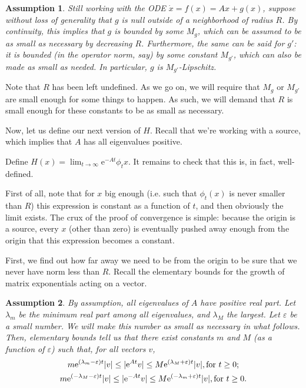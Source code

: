 \documentclass{article}
\newcommand{\e}{\mathrm{e}}
\DeclarePairedDelimiter{\abs}{\lvert}{\rvert}
\newtheorem*{Assumption}{Assumption}
\begin{document}
\begin{Assumption}
Still working with the ODE $\dot x = f(x) = A x + g(x)$, suppose without loss of generality that $g$ is null outside of a neighborhood of radius $R$. By continuity, this implies that $g$ is bounded by some $M_g$, which can be assumed to be as small as necessary by decreasing $R$. Furthermore, the same can be said for $g'$: it is bounded (in the operator norm, say) by some constant $M_{g'}$, which can also be made as small as needed. In particular, $g$ is $M_{g'}$-Lipschitz.
\end{Assumption}

Note that $R$ has been left undefined. As we go on, we will require that $M_g$ or $M_{g'}$ are small enough for some things to happen. As such, we will demand that $R$ is small enough for these constants to be as small as necessary.

Now, let us define our next version of $H$. Recall that we're working with a source, which implies that $A$ has all eigenvalues positive.

Define $H(x) = \lim_{t \to \infty} \e^{-A t} \phi_t x$. It remains to check that this is, in fact, well-defined.

First of all, note that for $x$ big enough (i.e. such that $\phi_t(x)$ is never smaller than $R$) this expression is constant as a function of $t$, and then obviously the limit exists. The crux of the proof of convergence is simple: because the origin is a source, every $x$ (other than zero) is eventually pushed away enough from the origin that this expression becomes a constant.

First, we find out how far away we need to be from the origin to be sure that we never have norm less than $R$. Recall the elementary bounds for the growth of matrix exponentials acting on a vector.

\begin{Assumption}
By assumption, all eigenvalues of $A$ have positive real part. Let $\lambda_m$ be the minimum real part among all eigenvalues, and $\lambda_M$ the largest. Let $\varepsilon$ be a small number. We will make this number as small as necessary in what follows. Then, elementary bounds tell us that there exist constants $m$ and $M$ (as a function of $\varepsilon$) such that, for all vectors $v$,
\begin{gather*}
m \e^{(\lambda_m - \varepsilon)t} \abs{v} \leq \abs{\e^{A t} v} \leq M \e^{(\lambda_M + \varepsilon)t} \abs{v}, \text{for $t \geq 0$};\\
m \e^{(-\lambda_M - \varepsilon) t} \abs{v} \leq \abs{\e^{-A t} v} \leq M \e^{(-\lambda_m + \varepsilon) t} \abs{v}, \text{for $t \geq 0$}.
\end{gather*}
\end{Assumption}
\end{document}
